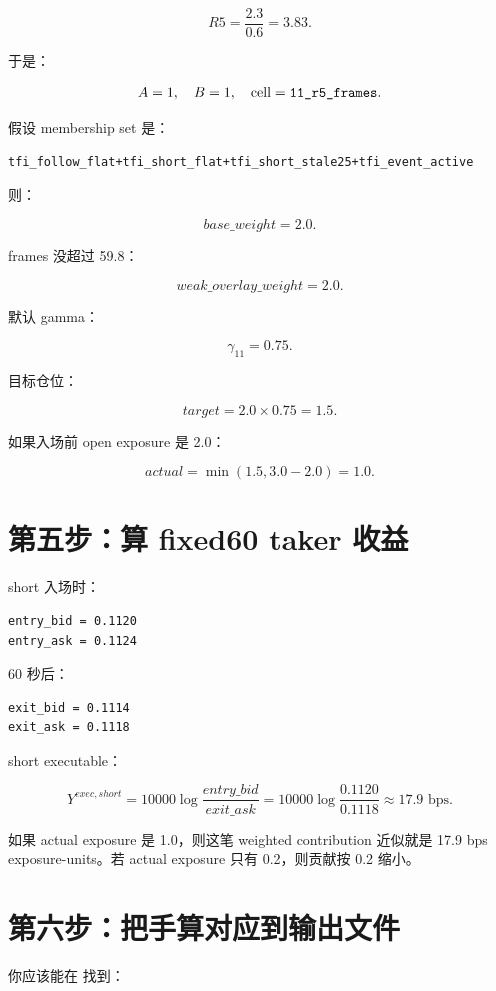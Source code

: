 \[
R5=\frac{2.3}{0.6}=3.83.
\]

于是：

\[
A=1,\quad B=1,\quad \text{cell}=\text{\ttfamily 11\_r5\_frames}.
\]

假设 membership set 是：

\begin{lstlisting}
tfi_follow_flat+tfi_short_flat+tfi_short_stale25+tfi_event_active
\end{lstlisting}

则：

\[
base\_weight=2.0.
\]

frames 没超过 59.8：

\[
weak\_overlay\_weight=2.0.
\]

默认 gamma：

\[
\gamma_{11}=0.75.
\]

目标仓位：

\[
target=2.0\times0.75=1.5.
\]

如果入场前 open exposure 是 2.0：

\[
actual=\min(1.5,3.0-2.0)=1.0.
\]

\section{第五步：算 fixed60 taker 收益}

short 入场时：

\begin{lstlisting}
entry_bid = 0.1120
entry_ask = 0.1124
\end{lstlisting}

60 秒后：

\begin{lstlisting}
exit_bid = 0.1114
exit_ask = 0.1118
\end{lstlisting}

short executable：

\[
Y^{exec,short}
=10000\log\frac{entry\_bid}{exit\_ask}
=10000\log\frac{0.1120}{0.1118}
\approx17.9\text{ bps}.
\]

如果 actual exposure 是 1.0，则这笔 weighted contribution 近似就是 17.9 bps exposure-units。若 actual exposure 只有 0.2，则贡献按 0.2 缩小。

\section{第六步：把手算对应到输出文件}

你应该能在  找到：


